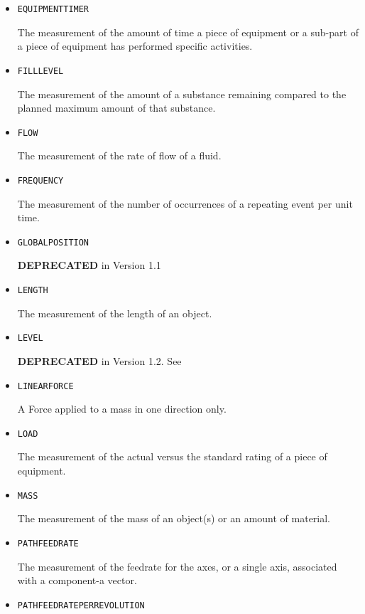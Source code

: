 \begin{itemize}
\item \texttt{EQUIPMENT\textunderscore TIMER}  

The measurement of the amount of time a piece of equipment or a sub-part of a piece of equipment has performed specific activities.


\item \texttt{FILL\textunderscore LEVEL}  

The measurement of the amount of a substance remaining compared to the planned maximum amount of that substance.


\item \texttt{FLOW}  

The measurement of the rate of flow of a fluid.


\item \texttt{FREQUENCY}  

The measurement of the number of occurrences of a repeating event per unit time.


\item \texttt{GLOBAL\textunderscore POSITION}  

\textbf{DEPRECATED} in Version 1.1


\item \texttt{LENGTH}  

The measurement of the length of an object.


\item \texttt{LEVEL}  

\textbf{DEPRECATED} in Version 1.2.  See 


\item \texttt{LINEAR\textunderscore FORCE}  

A \gls{Force} applied to a mass in one direction only.


\item \texttt{LOAD}  

The measurement of the actual versus the standard rating of a piece of equipment.


\item \texttt{MASS}  

The measurement of the mass of an object(s) or an amount of material.


\item \texttt{PATH\textunderscore FEEDRATE}  

The measurement of the feedrate for the axes, or a single axis, associated with a  component-a vector.


\item \texttt{PATH\textunderscore FEEDRATE\textunderscore PER\textunderscore REVOLUTION}  


\end{itemize}
